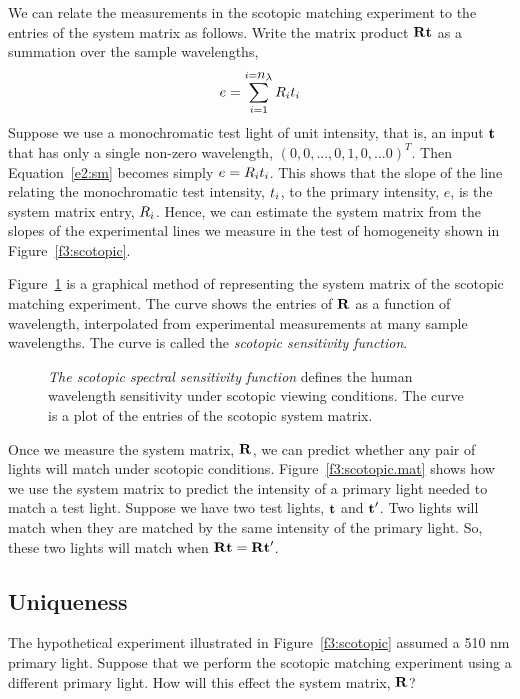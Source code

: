 We can relate the measurements in the scotopic matching
experiment to the entries of the system matrix as follows.
Write the matrix product $\mbox{$\bf R$} \mbox{${\bf t}$}$
as a summation over the sample wavelengths,
\begin{equation}
\label{e2:sm}
e = \sum_{i=1}^{i=\mbox{$n_\lambda$}} R_{i} \mbox{$t_{i}$} 
\end{equation}
Suppose we use a monochromatic test light of unit intensity, 
that is, an input $\mbox{${\bf t}$}$ that has only
a single non-zero wavelength, $(0,0,...,0,1,0,...0)^{T}$.
Then Equation~\ref{e2:sm} becomes simply $e = R_{i} \mbox{$t_{i}$}$.
This shows that the slope of the
line relating the monochromatic test intensity, $\mbox{$t_{i}$}$,
to the primary intensity, $e$,
is the system matrix entry, $R_{i}$.
Hence, we can estimate
the system matrix from the slopes of
the experimental lines we measure in the test of homogeneity
shown in Figure~\ref{f3:scotopic}.

Figure~\ref{f3:scot.sens} is a graphical method of representing
the system matrix of the scotopic matching experiment.
The curve shows the entries of $\mbox{$\bf R$}$ as a function of wavelength,
interpolated from experimental measurements at many sample wavelengths.
The curve is called the {\em scotopic sensitivity function}.
\begin{figure}
\centerline {
}
\caption[Scotopic Sensitivity]{
{\em The scotopic spectral sensitivity function} 
defines the human wavelength sensitivity under
scotopic viewing conditions.
The curve is a plot of the entries of the scotopic system matrix.
}
\label{f3:scot.sens}
\end{figure}

Once we measure the system matrix, $\mbox{$\bf R$}$,
we can predict whether any pair of lights will match under
scotopic conditions.
Figure~\ref{f3:scotopic.mat} shows how we use
the system matrix to predict the intensity of a primary light needed
to match a test light.
Suppose we have two test lights, $\mbox{${\bf t}$}$ and $\mbox{${\bf t}$} '$.
Two lights will match when they are matched by
the same intensity of the primary light.
So, these two lights will match when
$\mbox{$\bf R$} \mbox{${\bf t}$} = \mbox{$\bf R$} \mbox{${\bf t}$} '$.

\subsection*{Uniqueness}
The hypothetical experiment illustrated in
Figure~\ref{f3:scotopic} assumed a 510 nm primary light.
Suppose that we perform the scotopic matching experiment
using a different primary light.
How will this effect the system matrix, $\mbox{$\bf R$}$?

